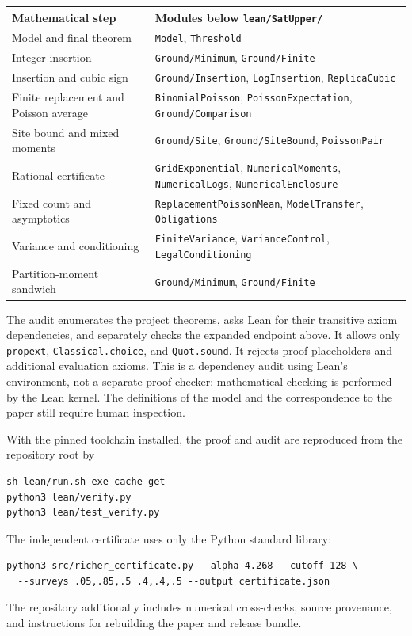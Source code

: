 \documentclass[11pt]{article}
\theoremstyle{remark}
\newcommand{\code}[1]{\texttt{\small #1}}
\begin{document}
\begin{center}
\small
\begin{tabular}{>{\raggedright\arraybackslash}p{}>{\raggedright\arraybackslash}p{}}
\toprule
Mathematical step & Modules below \code{lean/SatUpper/}\\
\midrule
Model and final theorem & \code{Model}, \code{Threshold}\\
Integer insertion & \code{Ground/Minimum}, \code{Ground/Finite}\\
Insertion and cubic sign & \code{Ground/Insertion}, \code{LogInsertion}, \code{ReplicaCubic}\\
Finite replacement and Poisson average & \code{BinomialPoisson}, \code{PoissonExpectation}, \code{Ground/Comparison}\\
Site bound and mixed moments & \code{Ground/Site}, \code{Ground/SiteBound}, \code{PoissonPair}\\
Rational certificate & \code{GridExponential}, \code{NumericalMoments}, \code{NumericalLogs}, \code{NumericalEnclosure}\\
Fixed count and asymptotics & \code{ReplacementPoissonMean}, \code{ModelTransfer}, \code{Obligations}\\
Variance and conditioning & \code{FiniteVariance}, \code{VarianceControl}, \code{LegalConditioning}\\
Partition-moment sandwich & \code{Ground/Minimum}, \code{Ground/Finite}\\
\bottomrule
\end{tabular}
\end{center}

The audit enumerates the project theorems, asks Lean for their transitive
axiom dependencies, and separately checks the expanded endpoint above.
It allows only \code{propext}, \code{Classical.choice}, and
\code{Quot.sound}. It rejects proof placeholders and additional
evaluation axioms. This is a dependency audit using Lean's environment,
not a separate proof checker: mathematical checking is performed by the
Lean kernel. The definitions of the model and the correspondence to the
paper still require human inspection.

With the pinned toolchain installed, the proof and audit are reproduced
from the repository root by
\begin{verbatim}
sh lean/run.sh exe cache get
python3 lean/verify.py
python3 lean/test_verify.py
\end{verbatim}
The independent certificate uses only the Python standard library:
\begin{verbatim}
python3 src/richer_certificate.py --alpha 4.268 --cutoff 128 \
  --surveys .05,.85,.5 .4,.4,.5 --output certificate.json
\end{verbatim}
The repository additionally includes numerical cross-checks, source
provenance, and instructions for rebuilding the paper and release bundle.

\end{document}
